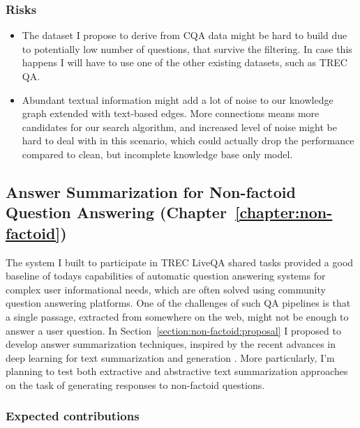 \subsubsection{Risks}
\label{section:proposal:plan:factoid:risks}

\begin{itemize}
\item The dataset I propose to derive from CQA data might be hard to build due to potentially low number of questions, that survive the filtering. In case this happens I will have to use one of the other existing datasets, such as TREC QA.
\item Abundant textual information might add a lot of noise to our knowledge graph extended with text-based edges. More connections means more candidates for our search algorithm, and increased level of noise might be hard to deal with in this scenario, which could actually drop the performance compared to clean, but incomplete knowledge base only model.
\end{itemize}


\subsection{Answer Summarization for Non-factoid Question Answering (Chapter~\ref{chapter:non-factoid})}
\label{section:proposal:plan:non-factoid}

The system I built to participate in TREC LiveQA shared tasks provided a good baseline of todays capabilities of automatic question answering systems for complex user informational needs, which are often solved using community question answering platforms.
One of the challenges of such QA pipelines is that a single passage, extracted from somewhere on the web, might not be enough to answer a user question.
In Section~\ref{section:non-factoid:proposal} I proposed to develop answer summarization techniques, inspired by the recent advances in deep learning for text summarization \cite{rush-chopra-weston:2015:EMNLP,chopraabstractive16} and generation \cite{karpathy2015deep}.
More particularly, I'm planning to test both extractive and abstractive text summarization approaches on the task of generating responses to non-factoid questions.

\subsubsection{Expected contributions}
\label{section:proposal:plan:non-factoid:contributions}

